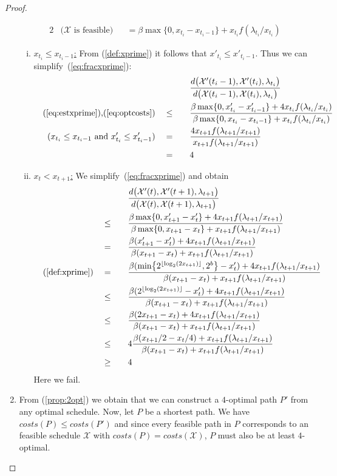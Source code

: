 \documentclass[hidelinks]{article}
\theoremstyle{plain}
\theoremstyle{definition}
\theoremstyle{rem}
\newcommand{\mx}{\mathcal{X}}
\begin{document}
\begin{sloppypar}
\begin{proof}
\begin{enumerate}
\begin{alignat}{2}
		&\text{($\mx$ is feasible)}&&=\beta\max\{0,x_{t_i}-x_{t_i-1}\}+x_{t_i}f(\lambda_{t_i}/x_{t_i})\label{eq:optcosts}
	\end{alignat}
	\begin{enumerate}[(i)]
		\item \underline{$x_{t_i}\le x_{t_i-1}$:}
			From (\ref{def:xprime}) it follows that $x'_{t_i}\le x'_{t_i-1}$. Thus we can simplify~(\ref{eq:fracxprime}):
		\begin{alignat*}{3}
			&&&&&\frac{d\bigl(\mx'(t_i-1),\mx'(t_i),\lambda_{t_i}\bigr)}{d\bigl(\mx(t_i-1),\mx(t_i),\lambda_{t_i}\bigr)}\\
			&&\text{(\ref{eq:estxprime}),(\ref{eq:optcosts})}\quad&\le\quad&&\frac{\beta\max\{0,x'_{t_i}-x'_{t_i-1}\}+4x_{t_i}f(\lambda_{t_i}/x_{t_i})}{\beta\max\{0,x_{t_i}-x_{t_i-1}\}+x_{t_i}f(\lambda_{t_i}/x_{t_i})}\\
			&&\text{($x_{t_i}\le x_{t_i-1}$ and $x'_{t_i}\le x'_{t_i-1}$)}\quad&=&&\frac{4x_{t+1}f(\lambda_{t+1}/x_{t+1})}{x_{t+1}f(\lambda_{t+1}/x_{t+1})}\\
			&&&=&&4
		\end{alignat*}
		\item \underline{$x_{t}<x_{t+1}$:}
		We simplify~(\ref{eq:fracxprime}) and obtain
		\begin{alignat*}{3}
			&&&&&\frac{d\bigl(\mx'(t),\mx'(t+1),\lambda_{t+1}\bigr)}{d\bigl(\mx(t),\mx(t+1),\lambda_{t+1}\bigr)}\\
			&&&\le\quad&&\frac{\beta\max\{0,x'_{t+1}-x'_t\}+4x_{t+1}f(\lambda_{t+1}/x_{t+1})}{\beta\max\{0,x_{t+1}-x_t\}+x_{t+1}f(\lambda_{t+1}/x_{t+1})}\\
			&&&=&&\frac{\beta(x'_{t+1}-x'_t)+4x_{t+1}f(\lambda_{t+1}/x_{t+1})}{\beta(x_{t+1}-x_t)+x_{t+1}f(\lambda_{t+1}/x_{t+1})}\\
			&&\text{(\ref{def:xprime})}\quad&=&&\frac{\beta(\min\bigl\{2^{\lfloor \log_2(2x_{t+1})\rfloor},2^b\bigr\}-x'_t)+4x_{t+1}f(\lambda_{t+1}/x_{t+1})}{\beta(x_{t+1}-x_t)+x_{t+1}f(\lambda_{t+1}/x_{t+1})}\\
			&&&\le&&\frac{\beta(2^{\lfloor \log_2(2x_{t+1})\rfloor}-x'_t)+4x_{t+1}f(\lambda_{t+1}/x_{t+1})}{\beta(x_{t+1}-x_t)+x_{t+1}f(\lambda_{t+1}/x_{t+1})}\\
			&&&\le&&\frac{\beta(2x_{t+1}-x_t)+4x_{t+1}f(\lambda_{t+1}/x_{t+1})}{\beta(x_{t+1}-x_t)+x_{t+1}f(\lambda_{t+1}/x_{t+1})}\\
			&&&\le&&4\frac{\beta(x_{t+1}/2-x_t/4)+x_{t+1}f(\lambda_{t+1}/x_{t+1})}{\beta(x_{t+1}-x_t)+x_{t+1}f(\lambda_{t+1}/x_{t+1})}\\
			&&&\ge&&4
		\end{alignat*}
		Here we fail.
	\end{enumerate}
	\item From (\ref{prop:2opt}) we obtain that we can construct a $4$-optimal path $P'$ from any optimal schedule. Now, let $P$ be a shortest path. We have $costs(P)\le costs(P')$ and since every feasible path in $P$ corresponds to an feasible schedule $\mx$ with $costs(P)=costs(\mx)$, $P$ must also be at least $4$-optimal.
\end{enumerate}
\end{proof}


\end{sloppypar}
\end{document}
